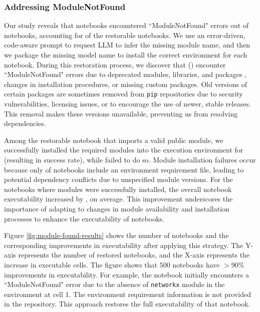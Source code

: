     \subsubsection{Addressing ModuleNotFound}   
        Our study reveals that \totalModuleNotFound notebooks encountered ``ModuleNotFound" errors out of \totalRestorable notebooks, accounting for \percentModuleNotFoundInRestorable of the restorable notebooks. We use an error-driven, code-aware prompt to request LLM to infer the missing module name, and then we package the missing model name to install the correct environment for each notebook. During this restoration process, we discover that \totalInvalidModuleNotFound (\percentInvalidModuleNotFoundInAllModuleNotFound) encounter ``ModuleNotFound" errors due to deprecated modules, libraries, and packages \cite{Wang2021, Zhu2021}, changes in installation procedures, or missing custom packages. Old versions of certain packages are sometimes removed from {\small{\texttt{pip}}} repositories due to security vulnerabilities, licensing issues, or to encourage the use of newer, stable releases. This removal makes these versions unavailable, preventing us from resolving dependencies. 
        
        Among the restorable notebook that imports a valid public module, we successfully installed the required modules into the execution environment for \totalModuleNotFoundRestored (resulting in \percentModuleNotFoundRestored success rate), while \totalModuleNotFoundNotRestored failed to do so. Module installation failures occur because only \percentRequirementInTotal of notebooks include an environment requirement file, leading to potential dependency conflicts due to unspecified module versions. For the notebooks where modules were successfully installed, the overall notebook executability increased by \averagePercentModuleNotFoundRestoredIncrease, on average. This improvement underscores the importance of adapting to changes in module availability and installation processes to enhance the executability of notebooks.
    
        Figure \ref{fig:module-found-results} shows the number of notebooks and the corresponding improvements in executability after applying this strategy. The Y-axis represents the number of restored notebooks, and the X-axis represents the increase in executable cells. The figure shows that 500 notebooks have $>$90\% improvements in executability. For example, the notebook \cite{Visualize-ML} initially encounters a ``ModuleNotFound" error due to the absence of {\small{\texttt{networkx}}} module in the environment at cell 1. The environment requirement information is not provided in the repository. This approach restores the full executability of that notebook.


